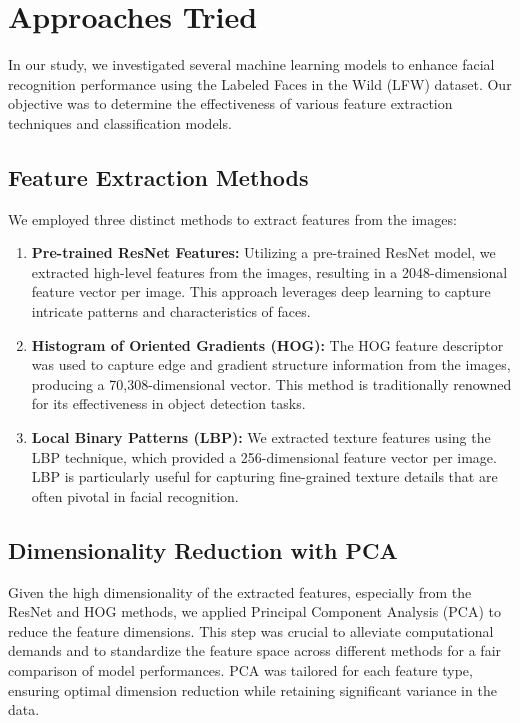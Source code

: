 \documentclass[a4paper]{article}
\theoremstyle{plain}
\theoremstyle{definition}
\begin{document}
	\newpage
	
	\section{Approaches Tried}
	
	In our study, we investigated several machine learning models to enhance facial recognition performance using the Labeled Faces in the Wild (LFW) dataset. Our objective was to determine the effectiveness of various feature extraction techniques and classification models.

\subsection*{Feature Extraction Methods}

We employed three distinct methods to extract features from the images:

\begin{enumerate}
    \item \textbf{Pre-trained ResNet Features\cite{resnet}:} Utilizing a pre-trained ResNet model, we extracted high-level features from the images, resulting in a 2048-dimensional feature vector per image. This approach leverages deep learning to capture intricate patterns and characteristics of faces.
    \item \textbf{Histogram of Oriented Gradients (HOG)\cite{hog}:} The HOG feature descriptor was used to capture edge and gradient structure information from the images, producing a 70,308-dimensional vector. This method is traditionally renowned for its effectiveness in object detection tasks.
    \item \textbf{Local Binary Patterns (LBP)\cite{lbp}:} We extracted texture features using the LBP technique, which provided a 256-dimensional feature vector per image. LBP is particularly useful for capturing fine-grained texture details that are often pivotal in facial recognition.
\end{enumerate}

\subsection*{Dimensionality Reduction with PCA}

Given the high dimensionality of the extracted features, especially from the ResNet and HOG methods, we applied Principal Component Analysis (PCA) \cite{PCA} to reduce the feature dimensions. This step was crucial to alleviate computational demands and to standardize the feature space across different methods for a fair comparison of model performances. PCA was tailored for each feature type, ensuring optimal dimension reduction while retaining significant variance in the data.
\end{document}
